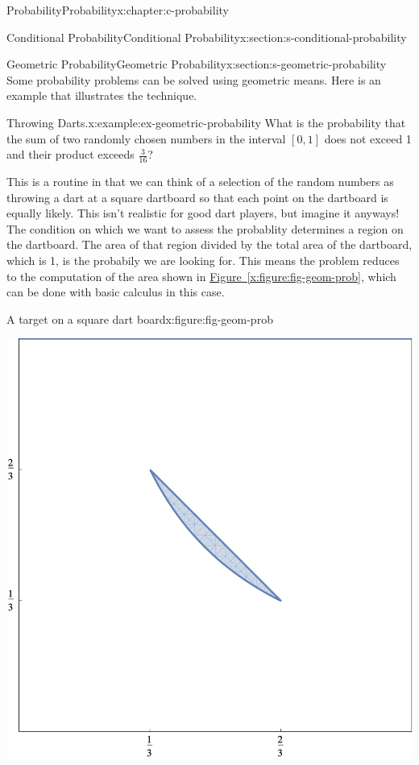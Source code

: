\documentclass[twoside,10pt,]{book}
\newcommand{\xreffont}{\relax}
\numberwithin{equation}{section}
\begin{document}
\begin{chapterptx}{Probability}{}{Probability}{}{}{x:chapter:c-probability}
\begin{sectionptx}{Conditional Probability}{}{Conditional Probability}{}{}{x:section:s-conditional-probability}
\end{sectionptx}
%
%
\typeout{************************************************}
\typeout{************************************************}
%
\begin{sectionptx}{Geometric Probability}{}{Geometric Probability}{}{}{x:section:s-geometric-probability}
Some probability problems can be solved using geometric means. Here is an example that illustrates the technique.%
\begin{example}{Throwing Darts.}{x:example:ex-geometric-probability}%
What is the probability that the sum of two randomly chosen numbers in the interval \([0, 1]\) does not exceed 1 and their product exceeds \(\frac{3}{16}\)?%
\par
This is a routine in that we can think of a selection of the random numbers as throwing a dart at a square dartboard so that each point on the dartboard is equally likely.  This isn't realistic for good dart players, but imagine it anyways!  The condition on which  we want to assess the probablity determines a region on the dartboard.  The area of that region divided by the total area of the dartboard, which is 1, is the probabily we are looking for.   This means the problem reduces to the computation of the area shown in \hyperref[x:figure:fig-geom-prob]{Figure~{\xreffont\ref{x:figure:fig-geom-prob}}}, which can be done with basic calculus in this case.%
\begin{figureptx}{A target on a square dart board}{x:figure:fig-geom-prob}{}%
\begin{image}{0.2}{0.6}{0.2}%
\includegraphics[width=\linewidth]{images/fig-geom-prob.png}

\end{image}
\end{figureptx}
\end{example}
\end{sectionptx}
\end{chapterptx}
\end{document}
